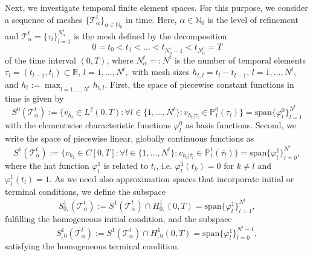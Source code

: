 \documentclass[a4paper,11pt]{article}
\newcommand{\N}{\mathbb N}
\newcommand{\R}{\mathbb R}
\begin{document}
Next, we investigate temporal finite element spaces. For this purpose, we consider a sequence of meshes $\{\mathcal T^t_{\alpha}\}_{\alpha \in \N_0}$ in time. Here, $\alpha \in \N_0$ is the level of refinement and $\mathcal T^t_\alpha =  \{ \tau_l \}_{l=1}^{N^t_\alpha}$ is the mesh defined by the decomposition
\begin{equation*}
	0 = t_0 < t_1 < \dots < t_{N^t_\alpha-1} < t_{N^t_\alpha} = T
\end{equation*}
of the time interval $(0,T)$, where $N^t_\alpha=:N^t$ is the number of temporal elements $\tau_l = (t_{l-1}, t_l) \subset \R$, $l=1,\dots, N^t,$ with mesh sizes $h_{t,l} = t_l - t_{l-1}$, $l=1,\dots, N^t,$ and $h_t := \max_{l=1,\dots, N^t} h_{t,l}.$ First, the space of piecewise constant functions in time is given by
\begin{equation*}
	S^0(\mathcal T^t_\alpha) := \Big\{ v_{h_t} \in L^2(0,T): \forall l \in \{ 1, \dots, N^t \}: v_{h_t|\tau_l} \in \mathbb P^0_1(\tau_l)  \Big\} =  \mathrm{span} \{\varphi^0_l\}_{l=1}^{N^t}
\end{equation*}
with the elementwise characteristic functions $\varphi^0_l$ as basis functions. Second, we write the space of piecewise linear, globally continuous functions as
\begin{equation*}
	S^1(\mathcal T^t_\alpha) := \Big\{ v_{h_t} \in C[0,T]: \forall l \in \{ 1, \dots, N^t \}: v_{h_t|\overline{\tau_l}} \in \mathbb P^1_1(\overline{\tau_l})  \Big\}  = \mathrm{span} \{\varphi^1_l\}_{l=0}^{N^t},
\end{equation*}
where the hat function $\varphi^1_l$ is related to $t_l$, i.e. $\varphi^1_l(t_k)=0$ for $k \neq l$ and $\varphi^1_l(t_l)=1$. As we need also approximation spaces that incorporate initial or terminal conditions, we define the subspace
\begin{equation*}
	S_{0,}^1(\mathcal T^t_\alpha) := S^1(\mathcal T^t_\alpha) \cap H^1_{0,}(0,T) = \mathrm{span} \{\varphi^1_l\}_{l=1}^{N^t},
\end{equation*}
fulfilling the homogeneous initial condition, and the subspace
\begin{equation*}
	S_{,0}^1(\mathcal T^t_\alpha) := S^1(\mathcal T^t_\alpha) \cap H^1_{,0}(0,T) = \mathrm{span} \{\varphi^1_l\}_{l=0}^{N^t-1},
\end{equation*}
satisfying the homogeneous terminal condition.
\end{document}
